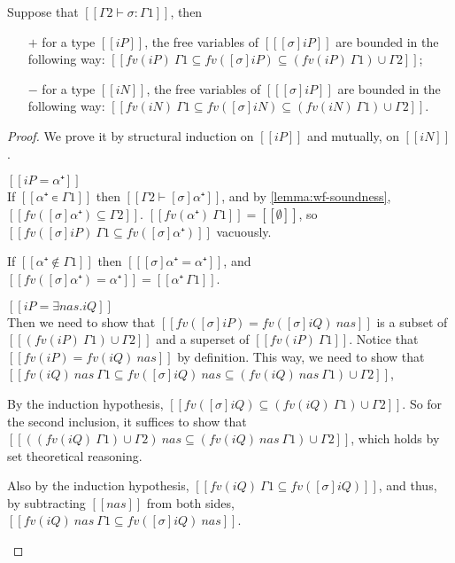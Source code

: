 \begin{lemma}
  \label{lemma:subst-fv}
  Suppose that $[[Γ2 ⊢ σ : Γ1]]$, then
  \begin{enumerate}
    \item [$+$] for a type $[[iP]]$,
      the free variables of $[[ [σ]iP ]]$ are bounded in the following way:
     $[[fv(iP) \ Γ1 ⊆ fv([σ]iP) ⊆ (fv(iP) \ Γ1) ∪ Γ2]]$;
    \item [$-$] for a type $[[iN]]$, 
      the free variables of $[[ [σ]iP ]]$ are bounded in the following way:
      $[[fv(iN) \ Γ1 ⊆ fv([σ]iN) ⊆ (fv(iN) \ Γ1) ∪ Γ2]]$.
  \end{enumerate}
\end{lemma}
\begin{proof}
  We prove it by structural induction on 
  $[[iP]]$ and mutually, on $[[iN]]$.
  \begin{caseof}
    \item $[[iP = α⁺]]$\\
      If $[[α⁺ ∊ Γ1]]$ then $[[Γ2 ⊢ [σ]α⁺]]$, and by 
      \cref{lemma:wf-soundness}, $[[fv([σ]α⁺) ⊆ Γ2]]$.
      $[[fv(α⁺) \ Γ1]] = [[∅]]$, so $[[fv([σ]iP) \ Γ1  ⊆ fv([σ]α⁺)]]$
      vacuously.

      If $[[α⁺ ∉ Γ1]]$ then $[[ [σ]α⁺ = α⁺ ]]$, and 
      $[[fv([σ]α⁺) = {α⁺}]] = [[{α⁺} \ Γ1]]$.
      
    \item $[[iP = ∃nas.iQ]]$\\
      Then we need to show that $[[fv([σ]iP) = fv([σ]iQ) \ {nas}]]$
      is a subset of $[[(fv(iP) \ Γ1) ∪ Γ2]]$ and a superset of
      $[[fv(iP) \ Γ1]]$.
      Notice that $[[fv(iP) = fv(iQ) \ {nas}]]$ by definition.
      This way, we need to show that 
      $[[fv(iQ) \ {nas} \ Γ1 ⊆ fv([σ]iQ) \ {nas} ⊆ (fv(iQ) \ {nas} \ Γ1) ∪ Γ2]]$,
      
      By the induction hypothesis, 
      $[[fv([σ]iQ) ⊆ (fv(iQ) \ Γ1) ∪ Γ2]]$.
      So for the second inclusion, it suffices to show that
      $[[((fv(iQ) \ Γ1) ∪ Γ2) \ {nas} ⊆ (fv(iQ) \ {nas} \ Γ1) ∪ Γ2]]$,
      which holds by set theoretical reasoning. 

      Also by the induction hypothesis,
      $[[fv(iQ) \ Γ1 ⊆ fv([σ]iQ)]]$,
      and thus, by subtracting $[[{nas}]]$ from both sides,
      $[[fv(iQ) \ {nas} \ Γ1 ⊆ fv([σ]iQ) \ {nas}]]$.


\end{caseof}
\end{proof}
